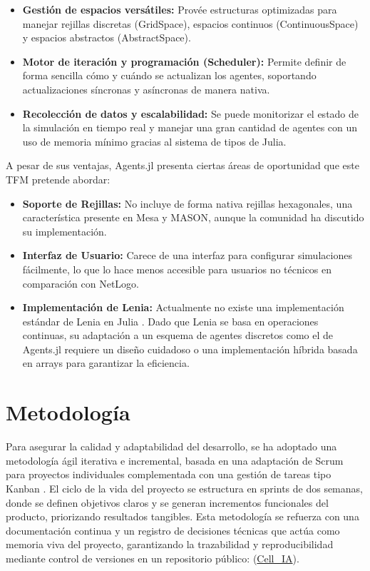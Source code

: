 \documentclass[runningheads]{llncs}
\begin{document}
\begin{itemize}
    \item \textbf{Gestión de espacios versátiles:} Provée estructuras optimizadas para manejar rejillas discretas (GridSpace), espacios continuos (ContinuousSpace) y espacios abstractos (AbstractSpace).
    \item \textbf{Motor de iteración y programación (Scheduler): }Permite definir de forma sencilla cómo y cuándo se actualizan los agentes, soportando actualizaciones síncronas y asíncronas de manera nativa.
    \item \textbf{Recolección de datos y escalabilidad:} Se puede monitorizar el estado de la simulación en tiempo real y manejar una gran cantidad de agentes con un uso de memoria mínimo gracias al sistema de tipos de Julia.
\end{itemize}

A pesar de sus ventajas, Agents.jl presenta ciertas áreas de oportunidad que este TFM pretende abordar:
\begin{itemize}
    \item \textbf{Soporte de Rejillas:} No incluye de forma nativa rejillas hexagonales, una característica presente en Mesa y MASON, aunque la comunidad ha discutido su implementación.
    \item \textbf{Interfaz de Usuario:} Carece de una interfaz para configurar simulaciones fácilmente, lo que lo hace menos accesible para usuarios no técnicos en comparación con NetLogo.
    \item \textbf{Implementación de Lenia:} Actualmente no existe una implementación estándar de Lenia en Julia \cite{ref_leniarepo}. Dado que Lenia se basa en operaciones continuas, su adaptación a un esquema de agentes discretos como el de Agents.jl requiere un diseño cuidadoso o una implementación híbrida basada en arrays para garantizar la eficiencia.
\end{itemize}

\section{Metodología}
\label{sec:metodologia}

Para asegurar la calidad y adaptabilidad del desarrollo, se ha adoptado una metodología ágil iterativa e incremental, basada en una adaptación de Scrum \cite{ref_scrum} para proyectos individuales complementada con una gestión de tareas tipo Kanban \cite{ref_kanban}. El ciclo de la vida del proyecto se estructura en sprints de dos semanas, donde se definen objetivos claros y se generan incrementos funcionales del producto, priorizando resultados tangibles. Esta metodología se refuerza con una documentación continua y un registro de decisiones técnicas que actúa como memoria viva del proyecto, garantizando la trazabilidad y reproducibilidad mediante control de versiones en un repositorio público: (\href{https://github.com/celhersot/Cell\_IA.jl}{Cell\_IA}).\\
\end{document}
